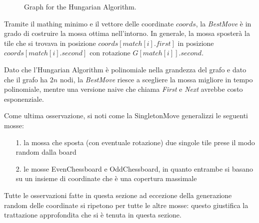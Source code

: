     	\begin{figure}[H]
            \centering
            \caption{Graph for the Hungarian Algorithm.}
            \label{fig:graph_hungarian}
    	\end{figure}

    Tramite il mathing minimo e il vettore delle coordinate $coords$, la \textit{BestMove} è in grado di costruire la mossa ottima nell'intorno. In generale, la mossa sposterà la tile che si trovava in posizione $coords[match[i].first]$ in posizione $coords[match[i].second]$ con rotazione $G[match[i]].second$.

    Dato che l'Hungarian Algorithm è polinomiale nella grandezza del grafo e dato che il grafo ha $2n$ nodi, la \textit{BestMove} riesce a scegliere la mossa migliore in tempo polinomiale, mentre una versione naive che chiama \textit{First} e \textit{Next} avrebbe costo esponenziale.

    Come ultima osservazione, si noti come la SingletonMove generalizzi le seguenti mosse:
    \begin{itemize}
    	\item[1.] la mossa che sposta (con eventuale rotazione) due singole tile prese il modo random dalla board
    	\item[2.] le mosse EvenChessboard e OddChessboard, in quanto entrambe si basano su un insieme di coordinate che è una copertura massimale
    \end{itemize}

    Tutte le osservazioni fatte in questa sezione ad eccezione della generazione random delle coordinate si ripetono per tutte le altre mosse: questo giustifica la trattazione approfondita che si è tenuta in questa sezione.

